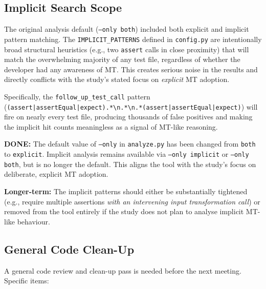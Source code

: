\documentclass[12pt,a4paper]{article}
\newenvironment{done}{\begin{mdframed}[linecolor=donecolor,linewidth=1pt]\textbf{\color{donecolor}DONE: }}{\end{mdframed}}
\begin{document}
\subsection{Implicit Search Scope}

The original analysis default (\texttt{--only both}) included both explicit
and implicit pattern matching. The \texttt{IMPLICIT\_PATTERNS} defined in
\texttt{config.py} are intentionally broad structural heuristics (e.g., two
\texttt{assert} calls in close proximity) that will match the overwhelming
majority of any test file, regardless of whether the developer had any
awareness of MT. This creates serious noise in the results and directly
conflicts with the study's stated focus on \emph{explicit} MT adoption.

Specifically, the \texttt{follow\_up\_test\_call} pattern
(\texttt{(assert|assertEqual|expect).*\textbackslash n.*\textbackslash n.*(assert|assertEqual|expect)})
will fire on nearly every test file, producing thousands of false positives and
making the implicit hit counts meaningless as a signal of MT-like reasoning.

\begin{done}
The default value of \texttt{--only} in \texttt{analyze.py} has been changed
from \texttt{both} to \texttt{explicit}. Implicit analysis remains available
via \texttt{--only implicit} or \texttt{--only both}, but is no longer the
default. This aligns the tool with the study's focus on deliberate, explicit MT
adoption.
\end{done}

\noindent
\textbf{Longer-term:} The implicit patterns should either be substantially
tightened (e.g., require multiple assertions \emph{with an intervening input
transformation call}) or removed from the tool entirely if the study does not
plan to analyse implicit MT-like behaviour.

\subsection{General Code Clean-Up}

A general code review and clean-up pass is needed before the next meeting.
Specific items:
\end{document}
